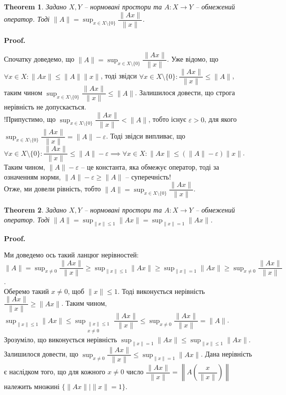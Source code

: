 \documentclass[a4paper, 10pt]{article}
\makeatletter
\theoremstyle{theoremdd}
\newtheorem{theorem}{Theorem}[subsection]
\theoremstyle{theoremdd}
\theoremstyle{theoremdd}
\theoremstyle{theoremdd}
\theoremstyle{theoremdd}
\theoremstyle{theoremdd}
\theoremstyle{theoremdd}
\theoremstyle{theoremdd}
\renewenvironment{proof}[1][Proof.\\]{\par
\pushQED{\hfill \qed}%
\normalfont \topsep6\p@\@plus6\p@\relax
\trivlist
\item\relax
{\bfseries
#1\@addpunct{.}}\hspace\labelsep\ignorespaces
}{%
\popQED\endtrivlist\@endpefalse
}
\makeatother
\begin{document}
\begin{theorem}
Задано $X,Y$ -- нормовані простори та $A \colon X \to Y$ -- обмежений оператор. Тоді $\displaystyle\|A\| = \sup_{x \in X \setminus \{0\}} \dfrac{\| Ax\|}{\|x\|}$.
\end{theorem}

\begin{proof}
Спочатку доведемо, що $\|A\| = \displaystyle\sup_{x \in X \setminus \{0\}} \dfrac{\| Ax\|}{\|x\|}$. Уже відомо, що $\forall x \in X: \|Ax \| \leq \|A \| \|x\|$, тоді звідси $\forall x \in X \setminus \{0\}: \dfrac{\|Ax\|}{\|x\|} \leq \|A\|$, таким чином $\displaystyle\sup_{x \in X \setminus \{0\}} \dfrac{\|Ax\|}{\|x\|} \leq \|A\|$. Залишилося довести, що строга нерівність не допускається.\\
!Припустимо, що $\displaystyle\sup_{x \in X \setminus \{0\}} \dfrac{\|Ax\|}{\|x\|} < \|A\|$, тобто існує $\varepsilon > 0$, для якого $\displaystyle\sup_{x \in X \setminus \{0\}} \dfrac{\|Ax\|}{\|x\|} = \|A\|- \varepsilon$. Тоді звідси випливає, що $\forall x \in X \setminus \{0\}: \dfrac{\|Ax\| }{\|x\|} \leq \|A\| - \varepsilon \implies \forall x \in X: \|Ax\| \leq (\|A\|-\varepsilon) \|x\|$. Таким чином, $\|A\|-\varepsilon$ -- це константа, яка обмежує оператор, тоді за означенням норми, $\|A\| - \varepsilon \geq \|A\|$ -- суперечність!\\
Отже, ми довели рівність, тобто $\|A\| = \displaystyle\sup_{x \in X \setminus \{0\}} \dfrac{\| Ax\|}{\|x\|}$.
\end{proof}

\begin{theorem}
Задано $X,Y$ -- нормовані простори та $A \colon X \to Y$ -- обмежений оператор. Тоді $\displaystyle\|A\| = \sup_{\|x\| \leq 1} \|Ax\| = \sup_{\|x\| = 1} \|Ax\|$.
\end{theorem}

\begin{proof}
Ми доведемо ось такий ланцюг нерівностей: $\|A\| = \displaystyle\sup_{x \neq 0} \dfrac{\|Ax\|}{\|x\|} \geq \sup_{\|x\|\leq 1} \|Ax\| \geq \sup_{\|x\| = 1} \|Ax\| \geq \sup_{x \neq 0} \dfrac{\|Ax\|}{\|x\|}$.\\
Оберемо такий $x \neq 0$, щоб $\|x\| \leq 1$. Тоді виконується нерівність $\dfrac{\|Ax\|}{\|x\|} \geq \|A x\|$. Таким чином, $\displaystyle\sup_{\|x\| \leq 1} \|Ax\| \leq \sup_{\substack{\|x\| \leq 1 \\ x \neq 0 }} \dfrac{\|Ax\|}{\|x\|} \leq \sup_{x \neq 0} \dfrac{\|Ax\|}{\|x\|} = \|A\|$.\\
Зрозуміло, що виконується нерівність $\displaystyle\sup_{\|x\| = 1} \|Ax\| \leq \sup_{\|x\| \leq 1} \|Ax\|$.\\
Залишилося довести, що $\displaystyle\sup_{x \neq 0} \dfrac{\|Ax\|}{\|x\|} \leq \sup_{\|x\|=  1} \|Ax\|$. Дана нерівність є наслідком того, що для кожного $x \neq 0$ число $\dfrac{\|Ax\|}{\|x\|} = \left\| A \left( \dfrac{x}{\|x\|} \right) \right\|$ належить множині $\{ \|Ax\| \mid \|x\| = 1\}$.
\end{proof}
\end{document}
